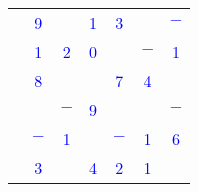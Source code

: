 \begin{corrige}
\smallskip
\begin{center}
   {
   \begin{tabular}{|*{7}{C{0.57}|}}
      \hline
      &  &  &  &  &  &  \\
      \hline
       & \textcolor{blue}{9} &  & \textcolor{blue}{1} & \textcolor{blue}{3} &  & \textcolor{blue}{$-$} \\
      \hline
       & \textcolor{blue}{1} & \textcolor{blue}{2} & \textcolor{blue}{0} &  & \textcolor{blue}{$-$} & \textcolor{blue}{1} \\
      \hline
       & \textcolor{blue}{8} &  &  & \textcolor{blue}{7} & \textcolor{blue}{4} &  \\
      \hline
       &  & \textcolor{blue}{$-$} & \textcolor{blue}{9} &  &  & \textcolor{blue}{$-$} \\
      \hline
       & \textcolor{blue}{$-$} & \textcolor{blue}{1} &  & \textcolor{blue}{$-$} & \textcolor{blue}{1} & \textcolor{blue}{6} \\
      \hline
       & \textcolor{blue}{3} &  & \textcolor{blue}{4} & \textcolor{blue}{2} & \textcolor{blue}{1} &  \\
      \hline
   \end{tabular}}
   \end{center}
\end{corrige}
